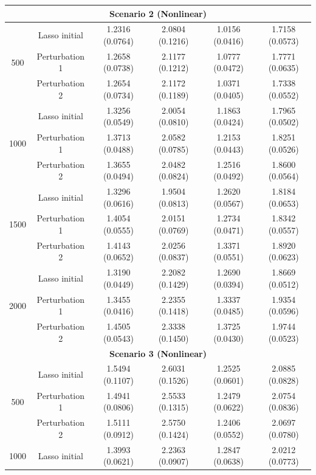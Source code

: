 \documentclass[12pt]{article}
\begin{document}
\begin{table}[!ht]
\begin{tabular}{cccccc}
        \hline
         \multicolumn{6}{c}{\textbf{Scenario 2 (Nonlinear)}}\\
        \hline
        \multirow{3}{*}{500} 
        & Lasso initial &1.2316 (0.0764) &2.0804 (0.1216) &1.0156 (0.0416) &1.7158 (0.0573) \\ 
        & Perturbation 1 & 1.2658 (0.0738) & 2.1177 (0.1212) & 1.0777 (0.0472) & 1.7771 (0.0635) \\
        & Perturbation 2  & 1.2654 (0.0734) & 2.1172 (0.1189)  & 1.0371 (0.0405) & 1.7338 (0.0552) \\
        \hline
        \multirow{3}{*}{1000} 
        & Lasso initial &1.3256 (0.0549) &2.0054 (0.0810) &1.1863 (0.0424) &1.7965 (0.0502)\\ 
        & Perturbation 1 & 1.3713 (0.0488) & 2.0582 (0.0785)  & 1.2153 (0.0443) & 1.8251 (0.0526)\\
        & Perturbation 2 & 1.3655 (0.0494) & 2.0482 (0.0824)  & 1.2516 (0.0492) & 1.8600 (0.0564) \\
        \hline
        \multirow{3}{*}{1500} 
        & Lasso initial &1.3296 (0.0616) &1.9504 (0.0813) &1.2620 (0.0567) &1.8184 (0.0653) \\ 
        & Perturbation 1 & 1.4054 (0.0555) & 2.0151 (0.0769)  & 1.2734 (0.0471)  & 1.8342 (0.0557) \\
        & Perturbation 2 & 1.4143 (0.0652) & 2.0256 (0.0837) & 1.3371 (0.0551) & 1.8920 (0.0623) \\
        \hline
        \multirow{3}{*}{2000} 
        & Lasso initial &1.3190 (0.0449) &2.2082 (0.1429) &1.2690 (0.0394) &1.8669 (0.0512) \\ 
        & Perturbation 1 & 1.3455 (0.0416) & 2.2355 (0.1418)  & 1.3337 (0.0485) & 1.9354 (0.0596) \\ 
        & Perturbation 2 & 1.4505 (0.0543) & 2.3338 (0.1450) & 1.3725 (0.0430) & 1.9744 (0.0523) \\
        \hline 
         \multicolumn{6}{c}{\textbf{Scenario 3 (Nonlinear)}}\\
        \hline
       \multirow{3}{*}{500} 
        & Lasso initial &1.5494 (0.1107) &2.6031 (0.1526) &1.2525 (0.0601) &2.0885 (0.0828) \\ 
        & Perturbation 1  & 1.4941 (0.0806) & 2.5533 (0.1315) & 1.2479 (0.0622) & 2.0754 (0.0836) \\
        & Perturbation 2  & 1.5111 (0.0912) & 2.5750 (0.1424)  & 1.2406 (0.0552) & 2.0697 (0.0780) \\
        \hline
        \multirow{3}{*}{1000} 
        & Lasso initial &1.3993 (0.0621) &2.2363 (0.0907) &1.2847 (0.0638) &2.0212 (0.0773) \\ 

\end{tabular}
\end{table}
\end{document}
